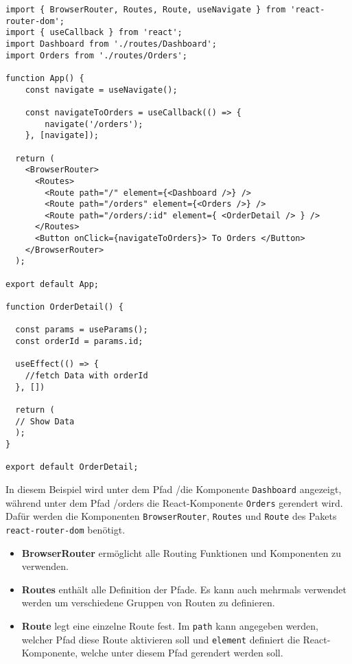 \begin{lstlisting}[style=codeStyle, caption={Beispiel von verschiedenen Komponenten auf verschiedenen Pfaden \\
Quelle: \cite{react-key-concepts} (abgewandelt)}, label={lst:react-router-example}]
import { BrowserRouter, Routes, Route, useNavigate } from 'react-router-dom';
import { useCallback } from 'react';
import Dashboard from './routes/Dashboard';
import Orders from './routes/Orders';

function App() {
	const navigate = useNavigate();
	
	const navigateToOrders = useCallback(() => {
		navigate('/orders');
	}, [navigate]);

  return (
    <BrowserRouter>
      <Routes>
        <Route path="/" element={<Dashboard />} />
        <Route path="/orders" element={<Orders />} />
        <Route path="/orders/:id" element={ <OrderDetail /> } />
      </Routes>
      <Button onClick={navigateToOrders}> To Orders </Button>
    </BrowserRouter>
  );

export default App;

function OrderDetail() {

  const params = useParams();
  const orderId = params.id; 
  
  useEffect(() => {
	//fetch Data with orderId  
  }, [])

  return (
  // Show Data
  );
}

export default OrderDetail;
\end{lstlisting}

In diesem Beispiel wird unter dem Pfad \glqq /\grqq{ }die Komponente \verb|Dashboard| angezeigt, während unter dem Pfad \glqq /orders\grqq{ } die React-Komponente \verb|Orders| gerendert wird. Dafür werden die Komponenten \verb|BrowserRouter|, \verb|Routes| und \verb|Route| des Pakets \linebreak \verb|react-router-dom| benötigt.
\begin{itemize}
\item \textbf{BrowserRouter} ermöglicht alle Routing Funktionen und Komponenten zu verwenden.
\item \textbf{Routes} enthält alle Definition der Pfade. Es kann auch mehrmals verwendet werden um verschiedene Gruppen von Routen zu definieren.
\item \textbf{Route} legt eine einzelne Route fest. Im \verb|path| kann angegeben werden, welcher Pfad diese Route aktivieren soll und \verb|element| definiert die React-Komponente, welche unter diesem Pfad gerendert werden soll.
\end{itemize}

